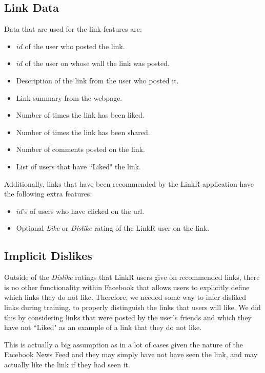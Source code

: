 \subsection{Link Data}

Data that are used for the link features are:
\begin{itemize}
\item{$id$ of the user who posted the link.}
\item{$id$ of the user on whose wall the link was posted.}
\item{Description of the link from the user who posted it.}
\item{Link summary from the webpage.}
\item{Number of times the link has been liked.}
\item{Number of times the link has been shared.}
\item{Number of comments posted on the link}.
\item{List of users that have ``Liked" the link.}
\end{itemize}
Additionally, links that have been recommended by the LinkR application have the following extra features:
\begin{itemize}
\item{$id$'s of users who have clicked on the url.}
\item{Optional \emph{Like} or \emph{Dislike} rating of the LinkR user on the link.}
\end{itemize}

\subsection{Implicit Dislikes}
Outside of the \emph{Dislike} ratings that LinkR users give on recommended links, there is no other functionality within Facebook that allows users to explicitly define which links they do not like. Therefore, we needed some way to infer disliked links during training, to properly distinguish the links that users will like. We did this by considering links that were posted by the user's friends and which they have not ``Liked" as an example of a link that they do not like.

This is actually a big assumption as in a lot of cases given the nature of the Facebook News Feed and they may simply have not have seen the link, and may actually like the link if they had seen it. %


